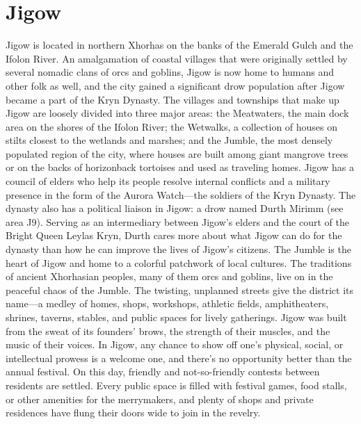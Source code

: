 \documentclass[10pt,a4paper,twoside,bg=print,twocolumn,openany,nodeprecatedcode]{dndbook}
\begin{document}
\section{Jigow}
Jigow is located in northern Xhorhas on the banks of the Emerald Gulch and the Ifolon River. An amalgamation of coastal villages that were originally settled by several nomadic clans of orcs and goblins, Jigow is now home to humans and other folk as well, and the city gained a significant drow population after Jigow became a part of the Kryn Dynasty.
The villages and townships that make up Jigow are loosely divided into three major areas: the Meatwaters, the main dock area on the shores of the Ifolon River; the Wetwalks, a collection of houses on stilts closest to the wetlands and marshes; and the Jumble, the most densely populated region of the city, where houses are built among giant mangrove trees or on the backs of horizonback tortoises and used as traveling homes.
Jigow has a council of elders who help its people resolve internal conflicts and a military presence in the form of the Aurora Watch—the soldiers of the Kryn Dynasty. The dynasty also has a political liaison in Jigow: a drow named Durth Mirimm (see area J9). Serving as an intermediary between Jigow's elders and the court of the Bright Queen Leylas Kryn, Durth cares more about what Jigow can do for the dynasty than how he can improve the lives of Jigow's citizens.
The Jumble is the heart of Jigow and home to a colorful patchwork of local cultures. The traditions of ancient Xhorhasian peoples, many of them orcs and goblins, live on in the peaceful chaos of the Jumble. The twisting, unplanned streets give the district its name—a medley of homes, shops, workshops, athletic fields, amphitheaters, shrines, taverns, stables, and public spaces for lively gatherings.
Jigow was built from the sweat of its founders' brows, the strength of their muscles, and the music of their voices. In Jigow, any chance to show off one's physical, social, or intellectual prowess is a welcome one, and there's no opportunity better than the annual festival. On this day, friendly and not-so-friendly contests between residents are settled. Every public space is filled with festival games, food stalls, or other amenities for the merrymakers, and plenty of shops and private residences have flung their doors wide to join in the revelry.
\end{document}
